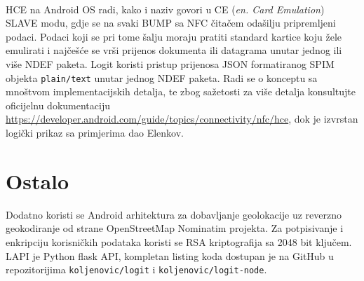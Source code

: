 \paragraph*{}
HCE na Android OS radi, kako i naziv govori u CE (\textit{en. Card Emulation}) SLAVE modu, gdje se na svaki BUMP sa NFC čitačem odašilju pripremljeni podaci. Podaci koji se pri tome šalju moraju pratiti standard kartice koju žele emulirati i najčešće se vrši prijenos dokumenta ili datagrama unutar jednog ili više NDEF paketa. Logit koristi pristup prijenosa JSON formatiranog SPIM objekta \texttt{plain/text} unutar jednog NDEF paketa. Radi se o konceptu sa mnoštvom implementacijskih detalja, te zbog sažetosti za više detalja konsultujte oficijelnu dokumentaciju \url{https://developer.android.com/guide/topics/connectivity/nfc/hce}, dok je izvrstan logički prikaz sa primjerima dao Elenkov\cite{Elenkov2015}.

\section{Ostalo}
Dodatno koristi se Android arhitektura za dobavljanje geolokacije\cite{geoa} uz reverzno geokodiranje od strane OpenStreetMap Nominatim projekta\cite{nominatim}. Za potpisivanje i enkripciju korisničkih podataka koristi se RSA\cite{rivest1978method} kriptografija sa 2048 bit ključem. LAPI je Python flask API, kompletan listing koda dostupan je na GitHub u repozitorijima \texttt{koljenovic/logit} i \texttt{koljenovic/logit-node}.